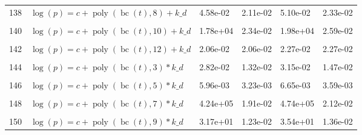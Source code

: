 \documentclass[12pt,a4paper]{article}
\DeclareMathOperator{\bc}{bc}
\DeclareMathOperator{\poly}{poly}
\begin{document}
\begin{longtable}[t]{ll>{\raggedleft\arraybackslash}p{2cm}>{\raggedleft\arraybackslash}p{2cm}>{\raggedleft\arraybackslash}p{2cm}>{\raggedleft\arraybackslash}p{2cm}}
138 & $\log(p) = c + \poly\left( \bc(t), 8 \right) + k\_d$ & 4.58e-02 & 2.11e-02 & 5.10e-02 & 2.33e-02\\
\cellcolor{gray!6}{139} & \cellcolor{gray!6}{$\log(p) = c + \poly\left( \bc(t), 9 \right) + k\_d$} & \cellcolor{gray!6}{2.50e-02} & \cellcolor{gray!6}{2.32e-02} & \cellcolor{gray!6}{2.77e-02} & \cellcolor{gray!6}{2.57e-02}\\
140 & $\log(p) = c + \poly\left( \bc(t), 10 \right) + k\_d$ & 1.78e+04 & 2.34e-02 & 1.98e+04 & 2.59e-02\\
\cellcolor{gray!6}{141} & \cellcolor{gray!6}{$\log(p) = c + \poly\left( \bc(t), 11 \right) + k\_d$} & \cellcolor{gray!6}{2.12e-02} & \cellcolor{gray!6}{2.09e-02} & \cellcolor{gray!6}{2.34e-02} & \cellcolor{gray!6}{2.31e-02}\\
142 & $\log(p) = c + \poly\left( \bc(t), 12 \right) + k\_d$ & 2.06e-02 & 2.06e-02 & 2.27e-02 & 2.27e-02\\
\cellcolor{gray!6}{143} & \cellcolor{gray!6}{$\log(p) = c + \poly\left( \bc(t), 13 \right) + k\_d$} & \cellcolor{gray!6}{5.34e+00} & \cellcolor{gray!6}{2.13e-02} & \cellcolor{gray!6}{5.97e+00} & \cellcolor{gray!6}{2.35e-02}\\
144 & $\log(p) = c + \poly\left( \bc(t), 3 \right) * k\_d$ & 2.82e-02 & 1.32e-02 & 3.15e-02 & 1.47e-02\\
\cellcolor{gray!6}{145} & \cellcolor{gray!6}{$\log(p) = c + \poly\left( \bc(t), 4 \right) * k\_d$} & \cellcolor{gray!6}{9.75e-03} & \cellcolor{gray!6}{9.72e-03} & \cellcolor{gray!6}{1.09e-02} & \cellcolor{gray!6}{1.08e-02}\\
146 & $\log(p) = c + \poly\left( \bc(t), 5 \right) * k\_d$ & 5.96e-03 & 3.23e-03 & 6.65e-03 & 3.59e-03\\
\cellcolor{gray!6}{147} & \cellcolor{gray!6}{$\log(p) = c + \poly\left( \bc(t), 6 \right) * k\_d$} & \cellcolor{gray!6}{8.80e-03} & \cellcolor{gray!6}{7.54e-03} & \cellcolor{gray!6}{9.82e-03} & \cellcolor{gray!6}{8.42e-03}\\
148 & $\log(p) = c + \poly\left( \bc(t), 7 \right) * k\_d$ & 4.24e+05 & 1.91e-02 & 4.74e+05 & 2.12e-02\\
\cellcolor{gray!6}{149} & \cellcolor{gray!6}{$\log(p) = c + \poly\left( \bc(t), 8 \right) * k\_d$} & \cellcolor{gray!6}{2.82e-02} & \cellcolor{gray!6}{1.74e-02} & \cellcolor{gray!6}{2.78e-02} & \cellcolor{gray!6}{1.94e-02}\\
150 & $\log(p) = c + \poly\left( \bc(t), 9 \right) * k\_d$ & 3.17e+01 & 1.23e-02 & 3.54e+01 & 1.36e-02\\

\end{longtable}
\end{document}
